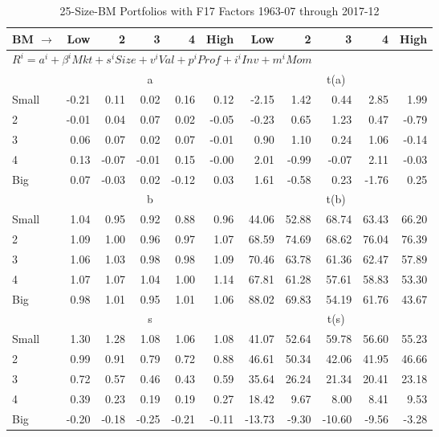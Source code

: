 
\begin{table}[!ht]
\footnotesize
\centering
\caption{25-Size-BM Portfolios with F17 Factors 1963-07 through 2017-12}
\begin{tabular}{lrrrrrrrrrr}
  \toprule
    
    BM $\rightarrow$ & Low & 2 & 3 & 4 & High & Low & 2 & 3 & 4 & High  \\ 
  \midrule
  \multicolumn{11}{l}{$R^i=a^i+\beta^iMkt+s^iSize+v^iVal+p^iProf+i^iInv+m^iMom$}  \\
  
     & \multicolumn{5}{c}{a} & \multicolumn{5}{c}{t(a)}   \\
     \cmidrule(r){2-6} \cmidrule(r){7-11} 
    Small  & -0.21  & 0.11  & 0.02  & 0.16  & 0.12  & -2.15  & 1.42  & 0.44  & 2.85  & 1.99   \\
    2  & -0.01  & 0.04  & 0.07  & 0.02  & -0.05  & -0.23  & 0.65  & 1.23  & 0.47  & -0.79   \\
    3  & 0.06  & 0.07  & 0.02  & 0.07  & -0.01  & 0.90  & 1.10  & 0.24  & 1.06  & -0.14   \\
    4  & 0.13  & -0.07  & -0.01  & 0.15  & -0.00  & 2.01  & -0.99  & -0.07  & 2.11  & -0.03   \\
    Big  & 0.07  & -0.03  & 0.02  & -0.12  & 0.03  & 1.61  & -0.58  & 0.23  & -1.76  & 0.25   \\
    
  
     & \multicolumn{5}{c}{b} & \multicolumn{5}{c}{t(b)}   \\
     \cmidrule(r){2-6} \cmidrule(r){7-11} 
    Small  & 1.04  & 0.95  & 0.92  & 0.88  & 0.96  & 44.06  & 52.88  & 68.74  & 63.43  & 66.20   \\
    2  & 1.09  & 1.00  & 0.96  & 0.97  & 1.07  & 68.59  & 74.69  & 68.62  & 76.04  & 76.39   \\
    3  & 1.06  & 1.03  & 0.98  & 0.98  & 1.09  & 70.46  & 63.78  & 61.36  & 62.47  & 57.89   \\
    4  & 1.07  & 1.07  & 1.04  & 1.00  & 1.14  & 67.81  & 61.28  & 57.61  & 58.83  & 53.30   \\
    Big  & 0.98  & 1.01  & 0.95  & 1.01  & 1.06  & 88.02  & 69.83  & 54.19  & 61.76  & 43.67   \\
    
  
     & \multicolumn{5}{c}{s} & \multicolumn{5}{c}{t(s)}   \\
     \cmidrule(r){2-6} \cmidrule(r){7-11} 
    Small  & 1.30  & 1.28  & 1.08  & 1.06  & 1.08  & 41.07  & 52.64  & 59.78  & 56.60  & 55.23   \\
    2  & 0.99  & 0.91  & 0.79  & 0.72  & 0.88  & 46.61  & 50.34  & 42.06  & 41.95  & 46.66   \\
    3  & 0.72  & 0.57  & 0.46  & 0.43  & 0.59  & 35.64  & 26.24  & 21.34  & 20.41  & 23.18   \\
    4  & 0.39  & 0.23  & 0.19  & 0.19  & 0.27  & 18.42  & 9.67  & 8.00  & 8.41  & 9.53   \\
    Big  & -0.20  & -0.18  & -0.25  & -0.21  & -0.11  & -13.73  & -9.30  & -10.60  & -9.56  & -3.28   \\
    

\end{tabular}
\end{table}
